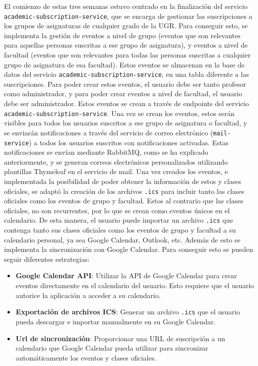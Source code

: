 El comienzo de estas tres semanas estuvo centrado en la finalización del servicio \texttt{academic-subscription-service}, que se encarga de gestionar las suscripciones a los grupos de asignaturas de cualquier grado de la UGR.\newline
Para conseguir esto, se implementa la gestión de eventos a nivel de grupo (eventos que son relevantes para aquellas personas suscritas a ese grupo de asignatura), y eventos a nivel de facultad (eventos que son relevantes para todas las personas suscritas a cualquier grupo de asignatura de esa facultad). Estos eventos se almacenan en la base de datos del servicio \texttt{academic-subscription-service}, en una tabla diferente a las suscripciones.\newline
Para poder crear estos eventos, el usuario debe ser tanto profesor como administrador, y para poder crear eventos a nivel de facultad, el usuario debe ser administrador. Estos eventos se crean a través de endpoints del servicio \texttt{academic-subscription-service}. 
\newline\newline
Una vez se crean los eventos, estos serán visibles para todos los usuarios suscritos a ese grupo de asignatura o facultad, y se enviarán notificaciones a través del servicio de correo electrónico (\texttt{mail-service}) a todos los usuarios suscritos con notificaciones activadas. Estas notificaciones se envían mediante RabbitMQ, como se ha explicado anteriormente, y se generan correos electrónicos personalizados utilizando plantillas Thymeleaf en el servicio de mail.
\newline\newline
Una vez creados los eventos, e implementada la posibilidad de poder obtener la información de estos y clases oficiales, se adaptó la creación de los archivos \texttt{.ics} para incluir tanto las clases oficiales como los eventos de grupo y facultad. Estos al contrario que las clases oficiales, no son recurrentes, por lo que se crean como eventos únicos en el calendario. De esta manera, el usuario puede importar un archivo \texttt{.ics} que contenga tanto sus clases oficiales como los eventos de grupo y facultad a su calendario personal, ya sea Google Calendar, Outlook, etc.\newline
\newline\newline
Además de esto se implementa la sincronización con Google Calendar. Para conseguir esto se pueden seguir diferentes estrategias:
\begin{itemize}
  \item \textbf{Google Calendar API}: Utilizar la API de Google Calendar para crear eventos directamente en el calendario del usuario. Esto requiere que el usuario autorice la aplicación a acceder a su calendario.
  \item \textbf{Exportación de archivos ICS}: Generar un archivo \texttt{.ics} que el usuario pueda descargar e importar manualmente en su Google Calendar.
  \item \textbf{Url de sincronización}: Proporcionar una URL de suscripción a un calendario que Google Calendar pueda utilizar para sincronizar automáticamente los eventos y clases oficiales.
\end{itemize}

